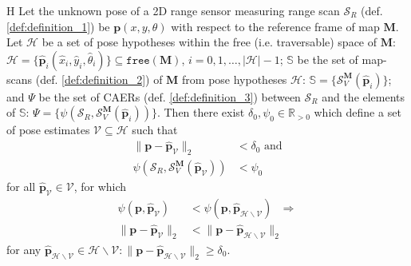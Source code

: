 
\begin{customhpt}{H}
  \label{hpt:hypothesis_h}
  Let the unknown pose of a 2D range sensor measuring range scan $\mathcal{S}_R$
  (def. \ref{def:definition_1}) be $\bm{p}(x,y,\theta)$ with respect to the
  reference frame of map $\bm{M}$.  Let $\mathcal{H}$ be a set of pose
  hypotheses within the free (i.e. traversable) space of $\bm{M}$:
  $\mathcal{H} = \{\hat{\bm{p}}_i(\hat{x}_i,\hat{y}_i,\hat{\theta}_i)\} \subseteq \texttt{free}(\bm{M})$, $i=0,1,\dots,|\mathcal{H}|-1$; $\mathbb{S}$
  be the set of map-scans (def. \ref{def:definition_2}) of $\bm{M}$ from pose
  hypotheses $\mathcal{H}$:
  $\mathbb{S} = \{\mathcal{S}_V^{\bm{M}}(\hat{\bm{p}}_i)\}$; and $\Psi$ be the
  set of CAERs (def. \ref{def:definition_3}) between $\mathcal{S}_R$ and the
  elements of $\mathbb{S}$:
  $\Psi = \{\psi(\mathcal{S}_R, \mathcal{S}_V^{\bm{M}}(\hat{\bm{p}}_i))\}$.
  Then there exist $\delta_0,\psi_0 \in \mathbb{R}_{> 0}$ which define a set of
  pose estimates $\mathcal{V} \subseteq \mathcal{H}$ such that
  \begin{align}
    \|\bm{p}-\hat{\bm{p}}_\mathcal{V}\|_2 &< \delta_0 \nonumber \text{ and}\\
    \psi(\mathcal{S}_R,\mathcal{S}_V^{\bm{M}}(\hat{\bm{p}}_\mathcal{V})) &< \psi_0 \nonumber
  \end{align}
  for all $\hat{\bm{p}}_\mathcal{V} \in \mathcal{V}$, for which
  \begin{align}
    \psi(\bm{p}, \hat{\bm{p}}_\mathcal{V}) &< \psi(\bm{p}, \hat{\bm{p}}_{\mathcal{H} \backslash \mathcal{V}}) \ \ \ \Rightarrow \nonumber \\
    \|\bm{p}-\hat{\bm{p}}_\mathcal{V}\|_2 &< \|\bm{p}-\hat{\bm{p}}_{\mathcal{H} \backslash \mathcal{V}}\|_2 \nonumber
  \end{align}
  for any $\hat{\bm{p}}_{\mathcal{H} \backslash \mathcal{V}} \in {\mathcal{H} \backslash \mathcal{V}}: \|\bm{p}-\hat{\bm{p}}_{\mathcal{H} \backslash \mathcal{V}}\|_2 \geq \delta_0$.
\end{customhpt}

\begin{figure}[]\centering
  
  \caption{\small }
  \label{fig:}
\end{figure}

\begin{figure}[]\centering
  
  \caption{\small }
  \label{fig:}
\end{figure}

\begin{figure}[]\centering
  
  \caption{\small }
  \label{fig:cbgl}
\end{figure}


\begin{figure}[]\centering
  
  \caption{\small }
  \label{fig:cbgl}
\end{figure}
